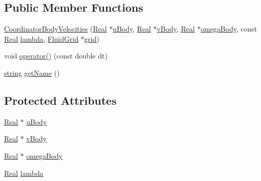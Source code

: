 \subsection*{Public Member Functions}
\begin{DoxyCompactItemize}
\item 
\hyperlink{class_coordinator_body_velocities_a24039137e6024c160f253a0c5e7ffa8c}{Coordinator\+Body\+Velocities} (\hyperlink{_h_d_f5_dumper_8h_a445a5f0e2a34c9d97d69a3c2d1957907}{Real} $\ast$\hyperlink{class_coordinator_body_velocities_ad44f24f272833d8f8958ea945543eff6}{u\+Body}, \hyperlink{_h_d_f5_dumper_8h_a445a5f0e2a34c9d97d69a3c2d1957907}{Real} $\ast$\hyperlink{class_coordinator_body_velocities_a5802af8438271a7ee6253f2a1c0695c4}{v\+Body}, \hyperlink{_h_d_f5_dumper_8h_a445a5f0e2a34c9d97d69a3c2d1957907}{Real} $\ast$\hyperlink{class_coordinator_body_velocities_a90b12064de38ba17d4d66198e73ffcbf}{omega\+Body}, const \hyperlink{_h_d_f5_dumper_8h_a445a5f0e2a34c9d97d69a3c2d1957907}{Real} \hyperlink{class_coordinator_body_velocities_afd8b8760d3e9f7fe256ced94c5c8ba15}{lambda}, \hyperlink{_definitions_8h_aff3288a3741f5098bcc456bb13440189}{Fluid\+Grid} $\ast$\hyperlink{class_generic_coordinator_aa514bbf7394bb5519c6f12daa33a375a}{grid})
\item 
void \hyperlink{class_coordinator_body_velocities_a0026fe01ababb24ef5918bca94421043}{operator()} (const double dt)
\item 
\hyperlink{testfpzip_8cpp_a984bb8e04129c4268bd6ff36a50c9fa4}{string} \hyperlink{class_coordinator_body_velocities_a5ba0919947f35c42da51c513ac6a610c}{get\+Name} ()
\end{DoxyCompactItemize}
\subsection*{Protected Attributes}
\begin{DoxyCompactItemize}
\item 
\hyperlink{_h_d_f5_dumper_8h_a445a5f0e2a34c9d97d69a3c2d1957907}{Real} $\ast$ \hyperlink{class_coordinator_body_velocities_ad44f24f272833d8f8958ea945543eff6}{u\+Body}
\item 
\hyperlink{_h_d_f5_dumper_8h_a445a5f0e2a34c9d97d69a3c2d1957907}{Real} $\ast$ \hyperlink{class_coordinator_body_velocities_a5802af8438271a7ee6253f2a1c0695c4}{v\+Body}
\item 
\hyperlink{_h_d_f5_dumper_8h_a445a5f0e2a34c9d97d69a3c2d1957907}{Real} $\ast$ \hyperlink{class_coordinator_body_velocities_a90b12064de38ba17d4d66198e73ffcbf}{omega\+Body}
\item 
\hyperlink{_h_d_f5_dumper_8h_a445a5f0e2a34c9d97d69a3c2d1957907}{Real} \hyperlink{class_coordinator_body_velocities_afd8b8760d3e9f7fe256ced94c5c8ba15}{lambda}
\end{DoxyCompactItemize}
